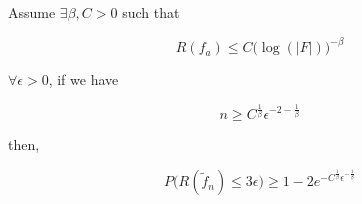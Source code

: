 \documentclass[
10pt, %
a4paper, %
oneside, %
headinclude,footinclude, %
BCOR5mm, %
]{scrartcl}
\begin{document}
    \begin{proposition}
	\label{prop:decay_approx}

	Assume $\exists \beta , C >0$ such that

	\begin{equation}
	    \label{eq:decay}
	    R(f_a)\leq C\big( \log(|F|) \big)^{-\beta}
	\end{equation}

	$\forall \epsilon >0$, if we have

	\begin{equation*}
	    n\geq C^{ \frac{1}{ \beta} } \epsilon^{-2- \frac{1}{\beta} }
	\end{equation*}

	then,

	\begin{equation*}
	    P\big(R( \tilde{f}_n)\leq 3\epsilon\big)\geq 1-2e^{ - C^{ \frac{1}{\beta} }\epsilon^{- \frac{1}{\beta} }}
	\end{equation*}
        
    \end{proposition}

%
%
%
%
%
%
%
%
%
%
\end{document}
